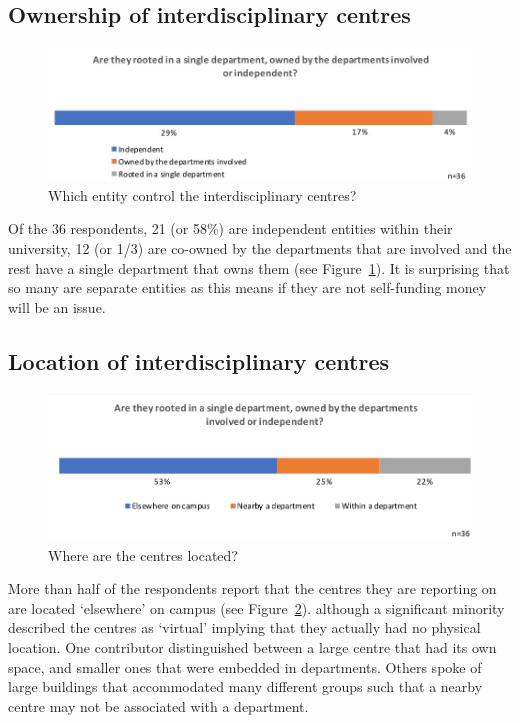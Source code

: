 \subsection{ Ownership of interdisciplinary centres}

\begin{figure}[h]
\centering
\includegraphics[width = \linewidth]{charts/5c.jpg}
\caption{Which entity control the interdisciplinary centres?}
\label{sect5:owners}
\end{figure}

Of the 36 respondents, 21 (or 58\%) are independent entities within their university, 12 (or 1/3) are co-owned by the departments that are involved and the rest have a single department that owns them (see Figure~\ref{sect5:owners}). It is surprising that so many are separate entities as this means if they are not self-funding money will be an issue.

\subsection{ Location of interdisciplinary centres}

\begin{figure}[h]
\centering
\includegraphics[width = \linewidth]{charts/5d.jpg}
\caption{ Where are the centres located?}
\label{sect5:locations}
\end{figure}

More than half of the respondents report that the centres they are reporting on are located `elsewhere' on campus (see Figure~\ref{sect5:locations}). although a significant minority described the centres as `virtual' implying that they actually had no physical location. One contributor distinguished between a large centre that had its own space, and smaller ones that were embedded in departments. Others spoke of large buildings that accommodated many different groups such that a nearby centre may not be associated with a department.

